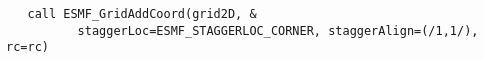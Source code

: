  \begin{verbatim}
   call ESMF_GridAddCoord(grid2D, &
          staggerLoc=ESMF_STAGGERLOC_CORNER, staggerAlign=(/1,1/), rc=rc)
 
\end{verbatim}

\setlength{\parskip}{\oldparskip}
\setlength{\parindent}{\oldparindent}
\setlength{\baselineskip}{\oldbaselineskip}
